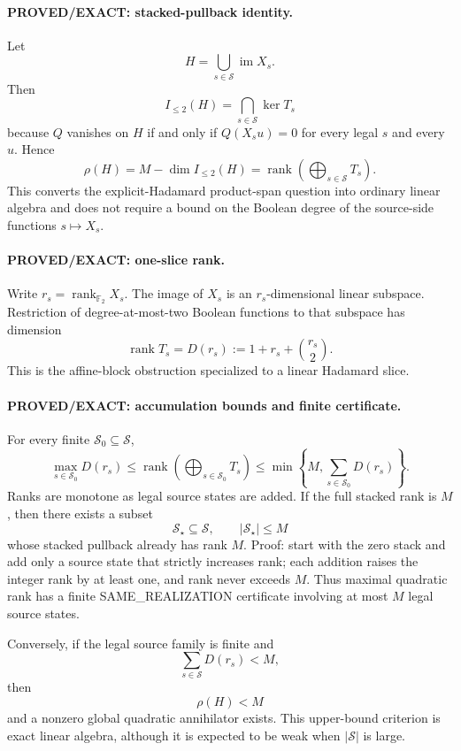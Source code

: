 \documentclass[11pt]{article}
\begin{document}
\paragraph{PROVED/EXACT: stacked-pullback identity.}
Let
\[
H=\bigcup_{s\in\mathcal S}\operatorname{im}X_s.
\]
Then
\[
\boxed{
I_{\le2}(H)=\bigcap_{s\in\mathcal S}\ker T_s
}
\]
because \(Q\) vanishes on \(H\) if and only if \(Q(X_su)=0\) for every legal \(s\) and every \(u\). Hence
\[
\boxed{
\rho(H)
=
M-\dim I_{\le2}(H)
=
\operatorname{rank}\!\left(\bigoplus_{s\in\mathcal S}T_s\right).
}
\]
This converts the explicit-Hadamard product-span question into ordinary linear algebra and does not require a bound on the Boolean degree of the source-side functions \(s\mapsto X_s\).

\paragraph{PROVED/EXACT: one-slice rank.}
Write \(r_s=\operatorname{rank}_{\mathbb F_2}X_s\). The image of \(X_s\) is an \(r_s\)-dimensional linear subspace. Restriction of degree-at-most-two Boolean functions to that subspace has dimension
\[
\boxed{
\operatorname{rank}T_s
=
D(r_s):=1+r_s+\binom{r_s}{2}.
}
\]
This is the affine-block obstruction specialized to a linear Hadamard slice.

\paragraph{PROVED/EXACT: accumulation bounds and finite certificate.}
For every finite \(\mathcal S_0\subseteq\mathcal S\),
\[
\max_{s\in\mathcal S_0}D(r_s)
\le
\operatorname{rank}\!\left(\bigoplus_{s\in\mathcal S_0}T_s\right)
\le
\min\!\left\{M,\sum_{s\in\mathcal S_0}D(r_s)\right\}.
\]
Ranks are monotone as legal source states are added. If the full stacked rank is \(M\), then there exists a subset
\[
\boxed{\mathcal S_\star\subseteq\mathcal S,\qquad |\mathcal S_\star|\le M}
\]
whose stacked pullback already has rank \(M\). Proof: start with the zero stack and add only a source state that strictly increases rank; each addition raises the integer rank by at least one, and rank never exceeds \(M\). Thus maximal quadratic rank has a finite SAME\_REALIZATION certificate involving at most \(M\) legal source states.

Conversely, if the legal source family is finite and
\[
\sum_{s\in\mathcal S}D(r_s)<M,
\]
then
\[
\boxed{\rho(H)<M}
\]
and a nonzero global quadratic annihilator exists. This upper-bound criterion is exact linear algebra, although it is expected to be weak when \(|\mathcal S|\) is large.
\end{document}
